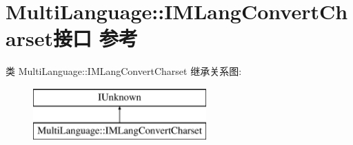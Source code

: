 \hypertarget{interface_multi_language_1_1_i_m_lang_convert_charset}{}\section{Multi\+Language\+:\+:I\+M\+Lang\+Convert\+Charset接口 参考}
\label{interface_multi_language_1_1_i_m_lang_convert_charset}
类 Multi\+Language\+:\+:I\+M\+Lang\+Convert\+Charset 继承关系图\+:\begin{figure}[H]
\begin{center}
\leavevmode
\includegraphics[height=2.000000cm]{interface_multi_language_1_1_i_m_lang_convert_charset}
\end{center}
\end{figure}
